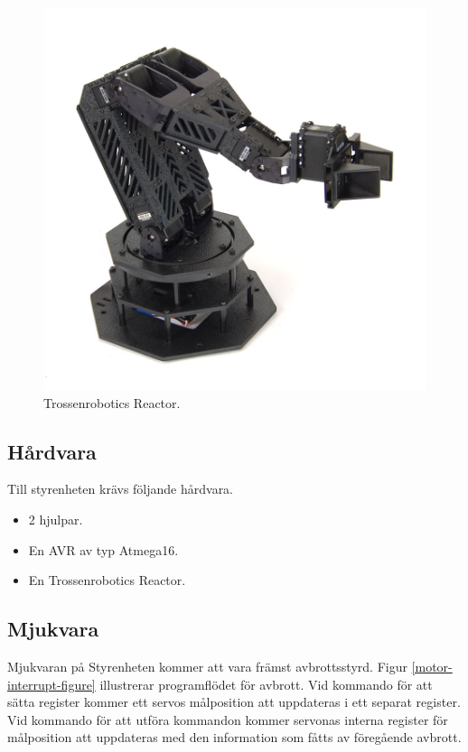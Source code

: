 \begin{figure}[h]
\center
\includegraphics[scale=0.35]{arm}
\caption{Trossenrobotics Reactor.}
\end{figure}

\subsection{Hårdvara}

Till styrenheten krävs följande hårdvara.
\begin{itemize}
\item{2 hjulpar.}
\item{En AVR av typ Atmega16.}
\item{En Trossenrobotics Reactor.}
\end{itemize}

\subsection{Mjukvara}

Mjukvaran på Styrenheten kommer att vara främst avbrottsstyrd. Figur \ref{motor-interrupt-figure} illustrerar programflödet för avbrott. Vid kommando för att sätta register kommer ett servos målposition att uppdateras i ett separat register. Vid kommando för att utföra kommandon kommer servonas interna register för målposition att uppdateras med den information som fåtts av föregående avbrott. \\

